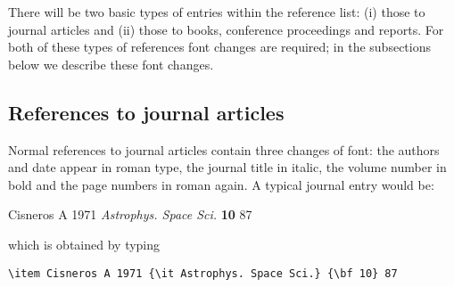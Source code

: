 There will be two basic types of 
entries within the reference list: (i) those to journal articles and 
(ii) those to books, conference proceedings and reports. For both of 
these types of references font changes are required; in the 
subsections below we describe these font changes.

\subsection{References to journal articles}
Normal references to  
journal articles contain three changes of 
font:
the authors and date appear in roman type, the journal title in 
italic, the volume number in bold and the page numbers in roman again. 
A typical journal entry would be:
\begin{thereferences}
\item Cisneros A 1971 {\it Astrophys. Space Sci.} {\bf 10} 87
\end{thereferences}
which is obtained by typing
\begin{verbatim}
\item Cisneros A 1971 {\it Astrophys. Space Sci.} {\bf 10} 87
\end{verbatim}

